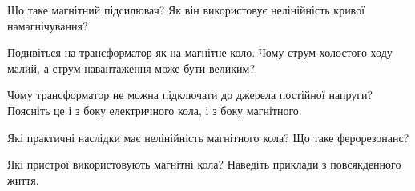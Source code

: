 \documentclass[]{ConspectBook}
\begin{document}
\begin{Questions}
\begin{quizlist}
	\item Що таке магнітний підсилювач? Як він використовує нелінійність кривої намагнічування?
	\item Подивіться на трансформатор як на магнітне коло. Чому струм холостого ходу малий, а струм навантаження може бути великим?
	\item Чому трансформатор не можна підключати до джерела постійної напруги? Поясніть це і з боку електричного кола, і з боку магнітного.
	\item Які практичні наслідки має нелінійність магнітного кола? Що таке ферорезонанс?
	\item Які пристрої використовують магнітні кола? Наведіть приклади з повсякденного життя.
\end{quizlist}
\end{Questions}
\end{document}
